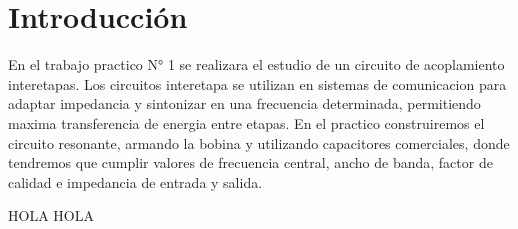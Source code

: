 \section{Introducción}

En el trabajo practico N° 1 se realizara el estudio de un circuito de acoplamiento interetapas. Los circuitos interetapa se utilizan en sistemas 
de comunicacion para adaptar impedancia y sintonizar en una frecuencia determinada, permitiendo maxima transferencia de energia entre etapas.
En el practico construiremos el circuito resonante, armando la bobina y utilizando capacitores comerciales, donde tendremos que cumplir valores de frecuencia central, ancho 
de banda, factor de calidad e impedancia de entrada y salida.

HOLA HOLA 
